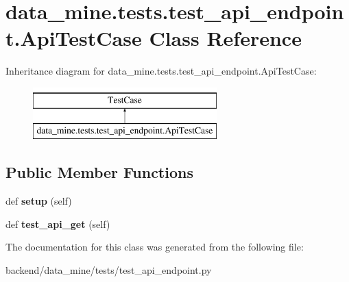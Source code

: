 \hypertarget{classdata__mine_1_1tests_1_1test__api__endpoint_1_1_api_test_case}{}\section{data\+\_\+mine.\+tests.\+test\+\_\+api\+\_\+endpoint.\+Api\+Test\+Case Class Reference}
\label{classdata__mine_1_1tests_1_1test__api__endpoint_1_1_api_test_case}
Inheritance diagram for data\+\_\+mine.\+tests.\+test\+\_\+api\+\_\+endpoint.\+Api\+Test\+Case\+:\begin{figure}[H]
\begin{center}
\leavevmode
\includegraphics[height=2.000000cm]{classdata__mine_1_1tests_1_1test__api__endpoint_1_1_api_test_case}
\end{center}
\end{figure}
\subsection*{Public Member Functions}
\begin{DoxyCompactItemize}
\item 
\mbox{\label{classdata__mine_1_1tests_1_1test__api__endpoint_1_1_api_test_case_af9d2687e79fb283887b9c0a3f3425942}} 
def {\bfseries setup} (self)
\item 
\mbox{\label{classdata__mine_1_1tests_1_1test__api__endpoint_1_1_api_test_case_a24c01ec1676be7417914a68d3545380e}} 
def {\bfseries test\+\_\+api\+\_\+get} (self)
\end{DoxyCompactItemize}


The documentation for this class was generated from the following file\+:\begin{DoxyCompactItemize}
\item 
backend/data\+\_\+mine/tests/test\+\_\+api\+\_\+endpoint.\+py\end{DoxyCompactItemize}
